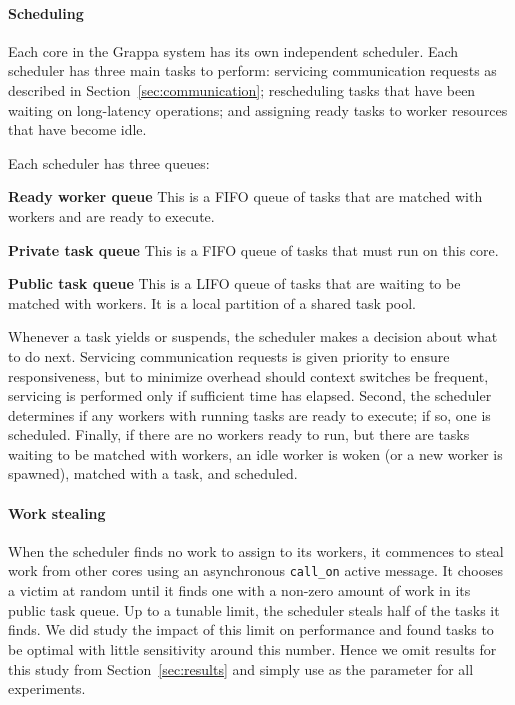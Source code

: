 \paragraph{Scheduling} Each core in the Grappa system has its own
independent scheduler. Each scheduler has three main tasks to perform:
servicing communication requests as described in
Section~\ref{sec:communication}; rescheduling tasks that have been
waiting on long-latency operations; and assigning ready tasks to
worker resources that have become idle.

Each scheduler has three queues:
\begin{description}
\item{\bf Ready worker queue} This is a FIFO queue of tasks that are
  matched with workers and are ready to execute.
\item{\bf Private task queue} This is a FIFO queue of tasks that must run on this core.
\item{\bf Public task queue} This is a LIFO queue of tasks that are
  waiting to be matched with workers. It is a local partition of a shared
  task pool.
\end{description}


Whenever a task yields or suspends, the scheduler makes a decision
about what to do next. Servicing communication requests is given priority
to ensure responsiveness, but to minimize overhead should context switches be frequent, servicing is performed only if sufficient time has elapsed.
Second, the scheduler determines if any workers with running tasks are
ready to execute; if so, one is scheduled. Finally, if there are no
workers ready to run, but there are tasks waiting to be matched with
workers, an idle worker is woken (or a new worker is spawned), matched
with a task, and scheduled.

\paragraph{Work stealing} 

When the scheduler finds no work to assign to its workers, it
commences to steal work from other cores using an asynchronous
\texttt{call\_on} active message.  It chooses a victim at random until it
finds one with a non-zero amount of work in its public task queue.  Up
to a tunable limit, the scheduler steals half of the tasks it finds.
We did study the impact of this limit on performance and found
 tasks to be optimal with little sensitivity around this
number.  Hence we omit results for this study from
Section~\ref{sec:results} and simply use  as the
parameter for all experiments.


